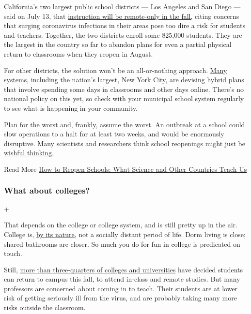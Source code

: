 California's two largest public school districts --- Los Angeles and San
Diego --- said on July 13, that
\href{https://www.nytimes3xbfgragh.onion/2020/07/13/us/lausd-san-diego-school-reopening.html}{instruction
will be remote-only in the fall,} citing concerns that surging
coronavirus infections in their areas pose too dire a risk for students
and teachers. Together, the two districts enroll some 825,000 students.
They are the largest in the country so far to abandon plans for even a
partial physical return to classrooms when they reopen in August.

For other districts, the solution won't be an all-or-nothing approach.
\href{https://bioethics.jhu.edu/research-and-outreach/projects/eschool-initiative/school-policy-tracker/}{Many
systems,} including the nation's largest, New York City, are devising
\href{https://www.nytimes3xbfgragh.onion/2020/06/26/us/coronavirus-schools-reopen-fall.html}{hybrid
plans} that involve spending some days in classrooms and other days
online. There's no national policy on this yet, so check with your
municipal school system regularly to see what is happening in your
community.

Plan for the worst and, frankly, assume the worst. An outbreak at a
school could slow operations to a halt for at least two weeks, and would
be enormously disruptive. Many scientists and researchers think school
reopenings might just be
\href{https://www.nytimes3xbfgragh.onion/2020/06/12/upshot/epidemiologists-decisions-children-school-coronavirus.html}{wishful
thinking.}

 Read More
\href{https://www.nytimes3xbfgragh.onion/2020/07/11/health/coronavirus-schools-reopen.html}{How
to Reopen Schools: What Science and Other Countries Teach Us}

\hypertarget{what-about-colleges}{%
\subsubsection{What about colleges?}\label{what-about-colleges}}

+

That depends on the college or college system, and is still pretty up in
the air. College is,
\href{https://www.nytimes3xbfgragh.onion/2020/06/15/opinion/coronavirus-college-safe.html}{by
its nature,} not a socially distant period of life. Dorm living is
close; shared bathrooms are closer. So much you do for fun in college is
predicated on touch.

Still,
\href{https://www.chronicle.com/article/Here-s-a-List-of-Colleges-/248626}{more
than three-quarters of colleges and universities} have decided students
can return to campus this fall, to attend in-class and remote studies.
But many
\href{https://www.nytimes3xbfgragh.onion/2020/07/03/us/coronavirus-college-professors.html}{professors
are concerned} about coming in to teach. Their students are at lower
risk of getting seriously ill from the virus, and are probably taking
many more risks outside the classroom.

